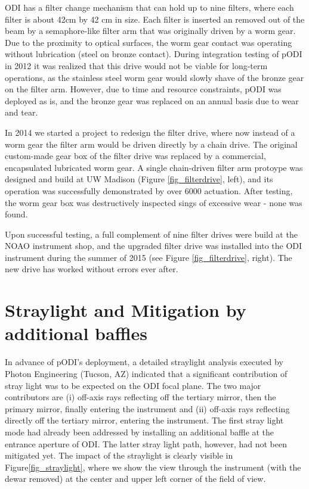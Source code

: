 \documentclass[]{spieman}
\begin{document}
ODI has a filter change mechanism that can hold up to nine filters, where each
filter is about 42cm by 42 cm in size. Each filter is inserted an removed out of
the beam by a semaphore-like filter arm that was originally driven by a worm
gear\cite{Muller2008}. Due to the proximity to optical surfaces, the worm gear
contact was operating without lubrication (steel on bronze contact). 
During integration testing of pODI in 2012 it was realized that this drive would not 
be viable for long-term operations, as the stainless steel worm gear would slowly
shave of the bronze gear on the filter arm. However, due to time and resource
constraints, pODI was deployed as is, and the bronze gear was replaced on an annual basis
due to wear and tear.


In 2014 we  started a project to redesign the filter drive, where now instead of
a worm gear the filter arm would be driven directly by a chain drive. The
original custom-made gear box of the filter drive was replaced by a commercial,
encapsulated lubricated worm gear. A single chain-driven filter arm protoype was
designed and build at UW Madison (Figure \ref{fig_filterdrive}, left), and its
operation was  successfully demonstrated by  over 6000 actuation. After testing,
the worm gear box was destructively inspected sings of excessive wear - none 
was found.

Upon successful testing, a full complement of nine filter drives were build at 
the NOAO instrument shop, and the upgraded filter drive was installed into the 
ODI instrument during the summer of 2015 (see Figure \ref{fig_filterdrive}, 
right). The new drive has worked without  errors ever after. 



\section{Straylight and Mitigation by additional baffles}

In advance of pODI's  deployment, a detailed straylight analysis executed by
Photon Engineering (Tucson, AZ) indicated that a significant contribution of 
stray light was to be expected on the ODI focal plane. The two major
contributors are (i) off-axis rays reflecting off the tertiary mirror, then the
primary mirror, finally entering the instrument and (ii) off-axis rays
reflecting directly off the tertiary mirror, entering the instrument. The first
stray light mode had already been addressed by installing an additional baffle
at the entrance aperture of ODI. The latter stray light path, however, had not
been mitigated yet. The impact of the straylight is clearly visible in
Figure\ref{fig_straylight}, where we show the view through the instrument (with
the dewar removed) at the center and upper left corner of the field of view.
\end{document}
